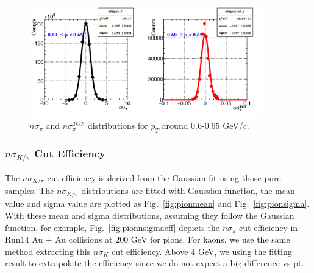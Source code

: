 \begin{figure}[htbp]
\centering
\includegraphics[keepaspectratio,width=0.9\textwidth,angle=0]{figure/Run14_D0HFT/nsigma_forPion.png}
\caption{$n\sigma_{\pi}$ and $n\sigma_{\pi}^{TOF}$ distributions for $p_T$ around 0.6-0.65 GeV/$c$.}
\label{fig:pion_samples}
\end{figure}

\subsubsection{$n\sigma_{K/\pi}$ Cut Efficiency}

The $n\sigma_{K/\pi}$ cut efficiency is derived from the Gaussian fit using those pure samples. The $n\sigma_{K/\pi}$ distributions are fitted with Gaussian function, the mean value and sigma value are plotted as Fig.~\ref{fig:pionmean} and Fig.~\ref{fig:pionsigma}. With these mean and sigma distributions, assuming they follow the Gaussian function, for example, Fig.~\ref{fig:pionnsigmaeff} depicts the $n\sigma_{\pi}$ cut efficiency in Run14 Au + Au collisions at 200 GeV for pions. For kaons, we use the same method extracting this $n\sigma_{K}$ cut efficiency. 
Above 4 GeV, we using the fitting result to extrapolate the efficiency since we do not expect a big difference vs pt.

